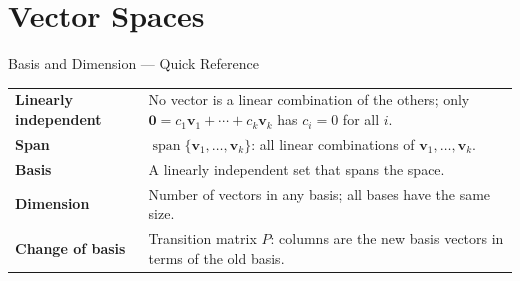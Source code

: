 

\section{Vector Spaces}

\begin{toolkitbox}{Basis and Dimension --- Quick Reference}
\begin{tabular}{@{}p{}p{}@{}}
\textbf{Linearly independent} & No vector is a linear combination of the others; only $\mathbf{0} = c_1\mathbf{v}_1 + \cdots + c_k\mathbf{v}_k$ has $c_i = 0$ for all $i$. \\[4pt]
\textbf{Span}                 & $\operatorname{span}\{\mathbf{v}_1,\ldots,\mathbf{v}_k\}$: all linear combinations of $\mathbf{v}_1,\ldots,\mathbf{v}_k$. \\[4pt]
\textbf{Basis}                & A linearly independent set that spans the space. \\[4pt]
\textbf{Dimension}            & Number of vectors in any basis; all bases have the same size. \\[4pt]
\textbf{Change of basis}      & Transition matrix $P$: columns are the new basis vectors in terms of the old basis. \\
\end{tabular}
\end{toolkitbox}







